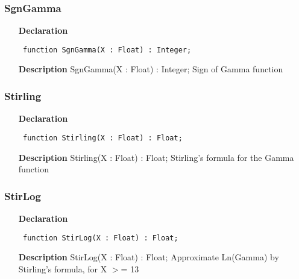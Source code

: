 \documentclass[12pt,a4paper,oneside]{report}
\newcommand{\declarationitem}[1]{\textbf{#1}}
\newcommand{\descriptiontitle}[1]{\textbf{#1}}
\newcommand{\code}[1]{\texttt{#1}}
\begin{document}
\subsubsection{SgnGamma}
\label{ugamma-SgnGamma}
\begin{itemize}\item[\declarationitem{Declaration}\hfill]
	\begin{flushleft}
		\code{
			function SgnGamma(X : Float) : Integer;}
		
	\end{flushleft}
	
	\par
	\item[\descriptiontitle{Description}]
	SgnGamma(X : Float) : Integer; Sign of Gamma function
	
\end{itemize}
\subsubsection{Stirling}
\label{ugamma-Stirling}
\begin{itemize}\item[\declarationitem{Declaration}\hfill]
	\begin{flushleft}
		\code{
			function Stirling(X : Float) : Float;}
		
	\end{flushleft}
	
	\par
	\item[\descriptiontitle{Description}]
	Stirling(X : Float) : Float; Stirling's formula for the Gamma function
	
\end{itemize}
\subsubsection{StirLog}
\label{ugamma-StirLog}
\begin{itemize}\item[\declarationitem{Declaration}\hfill]
	\begin{flushleft}
		\code{
			function StirLog(X : Float) : Float;}
		
	\end{flushleft}
	
	\par
	\item[\descriptiontitle{Description}]
	StirLog(X : Float) : Float; Approximate Ln(Gamma) by Stirling's formula, for X {$>$}= 13
	
\end{itemize}
\end{document}
